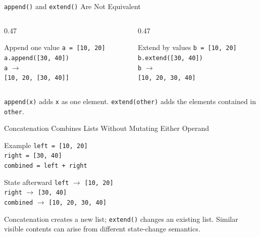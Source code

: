 \documentclass[aspectratio=169,10pt]{beamer}
\begin{document}
\begin{frame}{\texttt{append()} and \texttt{extend()} Are Not Equivalent}
  \begin{columns}[T,onlytextwidth]
    \begin{column}{0.47\textwidth}
      \begin{block}{Append one value}
        \texttt{a = [10, 20]}\\
        \texttt{a.append([30, 40])}\\[0.08in]
        \texttt{a} $\longrightarrow$\\
        \texttt{[10, 20, [30, 40]]}
      \end{block}
    \end{column}
    \begin{column}{0.47\textwidth}
      \begin{block}{Extend by values}
        \texttt{b = [10, 20]}\\
        \texttt{b.extend([30, 40])}\\[0.08in]
        \texttt{b} $\longrightarrow$\\
        \texttt{[10, 20, 30, 40]}
      \end{block}
    \end{column}
  \end{columns}

  \begin{keyidea}
    \texttt{append(x)} adds \texttt{x} as one element. \texttt{extend(other)} adds the elements contained in \texttt{other}.
  \end{keyidea}
\end{frame}

\begin{frame}{Concatenation Combines Lists Without Mutating Either Operand}
  \begin{block}{Example}
    \texttt{left = [10, 20]}\\
    \texttt{right = [30, 40]}\\
    \texttt{combined = left + right}
  \end{block}

  \begin{block}{State afterward}
    \texttt{left} $\longrightarrow$ \texttt{[10, 20]}\\
    \texttt{right} $\longrightarrow$ \texttt{[30, 40]}\\
    \texttt{combined} $\longrightarrow$ \texttt{[10, 20, 30, 40]}
  \end{block}

  \begin{keyidea}
    Concatenation creates a new list; \texttt{extend()} changes an existing list. Similar visible contents can arise from different state-change semantics.
  \end{keyidea}
\end{frame}
\end{document}
